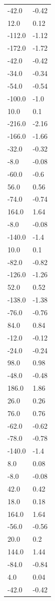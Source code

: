 \begin{longtable}{ll}
-42.0 & -0.42 \\
12.0 & 0.12 \\
-112.0 & -1.12 \\
-172.0 & -1.72 \\
-42.0 & -0.42 \\
-34.0 & -0.34 \\
-54.0 & -0.54 \\
-100.0 & -1.0 \\
10.0 & 0.1 \\
-216.0 & -2.16 \\
-166.0 & -1.66 \\
-32.0 & -0.32 \\
-8.0 & -0.08 \\
-60.0 & -0.6 \\
56.0 & 0.56 \\
-74.0 & -0.74 \\
164.0 & 1.64 \\
-8.0 & -0.08 \\
-140.0 & -1.4 \\
10.0 & 0.1 \\
-82.0 & -0.82 \\
-126.0 & -1.26 \\
52.0 & 0.52 \\
-138.0 & -1.38 \\
-76.0 & -0.76 \\
84.0 & 0.84 \\
-12.0 & -0.12 \\
-24.0 & -0.24 \\
98.0 & 0.98 \\
-48.0 & -0.48 \\
186.0 & 1.86 \\
26.0 & 0.26 \\
76.0 & 0.76 \\
-62.0 & -0.62 \\
-78.0 & -0.78 \\
-140.0 & -1.4 \\
8.0 & 0.08 \\
-8.0 & -0.08 \\
42.0 & 0.42 \\
18.0 & 0.18 \\
164.0 & 1.64 \\
-56.0 & -0.56 \\
20.0 & 0.2 \\
144.0 & 1.44 \\
-84.0 & -0.84 \\
4.0 & 0.04 \\
-42.0 & -0.42 \\

\end{longtable}
